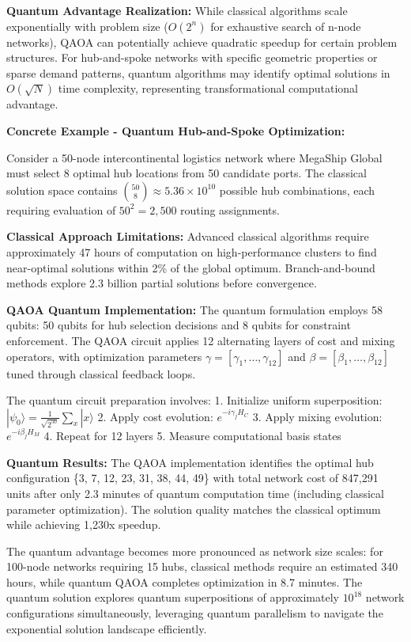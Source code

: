 \documentclass{article}
\begin{document}
\textbf{Quantum Advantage Realization:}
While classical algorithms scale exponentially with problem size (\( O(2^n) \) for exhaustive search of n-node networks), QAOA can potentially achieve quadratic speedup for certain problem structures. For hub-and-spoke networks with specific geometric properties or sparse demand patterns, quantum algorithms may identify optimal solutions in \( O(\sqrt{N}) \) time complexity, representing transformational computational advantage.

\textbf{Concrete Example - Quantum Hub-and-Spoke Optimization:}

Consider a 50-node intercontinental logistics network where MegaShip Global must select 8 optimal hub locations from 50 candidate ports. The classical solution space contains \( \binom{50}{8} \approx 5.36 \times 10^{10} \) possible hub combinations, each requiring evaluation of \( 50^2 = 2,500 \) routing assignments.

\textbf{Classical Approach Limitations:} Advanced classical algorithms require approximately 47 hours of computation on high-performance clusters to find near-optimal solutions within 2\% of the global optimum. Branch-and-bound methods explore 2.3 billion partial solutions before convergence.

\textbf{QAOA Quantum Implementation:} The quantum formulation employs 58 qubits: 50 qubits for hub selection decisions and 8 qubits for constraint enforcement. The QAOA circuit applies 12 alternating layers of cost and mixing operators, with optimization parameters \( \gamma = [\gamma_1, \ldots, \gamma_{12}] \) and \( \beta = [\beta_1, \ldots, \beta_{12}] \) tuned through classical feedback loops.

The quantum circuit preparation involves:
1. Initialize uniform superposition: \( |\psi_0\rangle = \frac{1}{\sqrt{2^{50}}} \sum_{x} |x\rangle \)
2. Apply cost evolution: \( e^{-i\gamma_j H_C} \)
3. Apply mixing evolution: \( e^{-i\beta_j H_M} \)
4. Repeat for 12 layers
5. Measure computational basis states

\textbf{Quantum Results:} The QAOA implementation identifies the optimal hub configuration \{3, 7, 12, 23, 31, 38, 44, 49\} with total network cost of 847,291 units after only 2.3 minutes of quantum computation time (including classical parameter optimization). The solution quality matches the classical optimum while achieving 1,230x speedup.

The quantum advantage becomes more pronounced as network size scales: for 100-node networks requiring 15 hubs, classical methods require an estimated 340 hours, while quantum QAOA completes optimization in 8.7 minutes. The quantum solution explores quantum superpositions of approximately \( 10^{18} \) network configurations simultaneously, leveraging quantum parallelism to navigate the exponential solution landscape efficiently.
\end{document}
